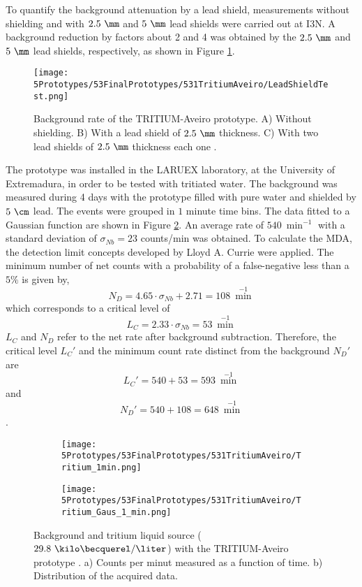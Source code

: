 To quantify the background attenuation by a lead shield, measurements without shielding and with $2.5~\mm$ and $5~\mm$ lead shields were carried out at I3N. A background reduction by factors about 2 and 4 was obtained by the $2.5~\mm$ and $5~\mm$ lead shields, respectively, as shown in Figure \ref{fig:LeadShieldTest}.
\begin{figure}[h]
\centering
\texttt{[image: 5Prototypes/53FinalPrototypes/531TritiumAveiro/LeadShieldTest.png]}
\caption{Background rate of the TRITIUM-Aveiro prototype. A) Without shielding. B) With a lead shield of $2.5~\mm$ thickness. C) With two lead shields of $2.5~\mm$ thickness each one \cite{ExperimentalPaperCarlos}.\label{fig:LeadShieldTest}}
\end{figure}

The prototype was installed in the LARUEX laboratory, at the University of Extremadura, in order to be tested with tritiated water. The background was measured during 4 days with the prototype filled with pure water and shielded by $5~\cm$ lead. The events were grouped in $1$ minute time bins. The data fitted to a Gaussian function are shown in Figure \ref{subfig:MeasurementInRealTime}. An average rate of $540~\min^{-1}$ with a standard deviation of $\sigma_{Nb}=23$ counts/min was obtained. To calculate the MDA, the detection limit concepts developed by Lloyd A. Currie \cite{CurieLimit} were applied. The minimum number of net counts with a probability of a false-negative less than a $5\%$ is given by,
\begin{equation}
N_D = 4.65 \cdot{}\sigma_{Nb} + 2.71 = 108~\min^{-1}
\label{eq:EquationNetCounts}
\end{equation}
which corresponds to a critical level of 
$$L_C = 2.33\cdot{}\sigma_{Nb}=53 ~\min^{-1}$$
$L_C$ and $N_D$ refer to the net rate after background subtraction. Therefore, the critical level $L_C'$ and the minimum count rate distinct from the background $N_D'$ are $$L_C'=540+53 = 593~\min^{-1}$$ and $$N_D'= 540+108=648~\min^{-1}$$.
\begin{figure}
\centering
    \begin{subfigure}[b]{0.45\textwidth}
    \centering
    \texttt{[image: 5Prototypes/53FinalPrototypes/531TritiumAveiro/Tritium\_1min.png]}  
    \caption{\label{subfig:MeasurementInRealTime}}
    \end{subfigure}
    \hfill
    \begin{subfigure}[b]{0.45\textwidth}
    \centering
    \texttt{[image: 5Prototypes/53FinalPrototypes/531TritiumAveiro/Tritium\_Gaus\_1\_min.png]}  
    \caption{\label{subfig:DistributionofMeasurement}}
    \end{subfigure}
 \caption{Background and tritium liquid source ($29.8~\kilo\becquerel/\liter$) with the TRITIUM-Aveiro prototype \cite{ExperimentalPaperCarlos}. a) Counts per minut measured as a function of time. b) Distribution of the acquired data.}
 \label{fig:BackgroundTritium1min}
\end{figure}
